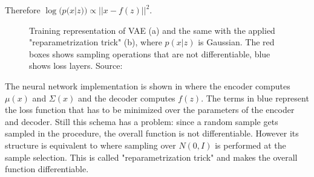 Therefore $\log(p(x|z)) \propto ||x-f(z)||^2 $.
\begin{figure}
    \centering
    \caption{Training representation of VAE (a) and the same with the applied "reparametrization trick" (b), where $p(x|z)$ is Gaussian. The red boxes shows sampling operations that are not differentiable, blue shows loss layers. Source:~\cite{doersch2016tutorial} }
    \label{fig:vae_tutorial}
\end{figure}
The neural network implementation is shown in \Figure{\ref{fig:vae_tutorial_a}}%
where the encoder computes $\mu(x)$ and $\Sigma(x)$ and the decoder computes $f(z)$. The terms in blue represent the loss function that has to be minimized over the parameters of the encoder and decoder. Still this schema has a problem: since a random sample gets sampled in the procedure, the overall function is not differentiable. However its structure is equivalent to \Figure{\ref{fig:vae_tutorial_b}} where sampling over $N(0,I)$ is performed at the sample selection.
This is called "reparametrization trick" and makes the overall function differentiable.



